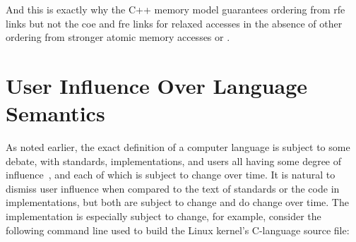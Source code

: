 \documentclass[10]{article}
\begin{document}
And this is exactly why the C++ memory model guarantees ordering from
rfe links but not the coe and fre links for relaxed accesses in the
absence of other ordering from stronger atomic memory accesses or
.

\clearpage

\section{User Influence Over Language Semantics}
\label{app:User Influence Over Language Semantics}

As noted earlier, the exact definition of a computer language is subject
to some debate, with standards, implementations, and users all having
some degree of
influence~\cite{KayvanMemarian2016DepthOfC-1,KayvanMemarian2016DepthOfC-2},
and each of which is subject to change over time.
It is natural to dismiss user influence when compared to the text of
standards or the code in implementations, but both are subject to
change and do change over time.
The implementation is especially subject to change, for example,
consider the following command line used to build the Linux kernel's
 C-language source file:
\end{document}
